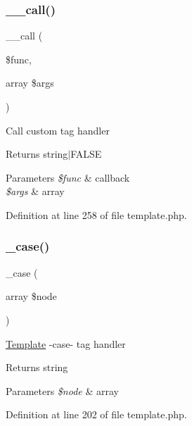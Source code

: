 \subsubsection{\texorpdfstring{\+\_\+\+\_\+call()}{\_\_call()}}
{\footnotesize\ttfamily \+\_\+\+\_\+call (\begin{DoxyParamCaption}\item[{}]{\$func,  }\item[{array}]{\$args }\end{DoxyParamCaption})}

Call custom tag handler \begin{DoxyReturn}{Returns}
string$\vert$\+F\+A\+L\+SE 
\end{DoxyReturn}

\begin{DoxyParams}{Parameters}
{\em \$func} & callback \\
\hline
{\em \$args} & array \\
\hline
\end{DoxyParams}


Definition at line 258 of file template.\+php.

\hypertarget{class_template_ae79c95442d3831174486776ca3090bb6}{}\label{class_template_ae79c95442d3831174486776ca3090bb6} 
\subsubsection{\texorpdfstring{\+\_\+case()}{\_case()}}
{\footnotesize\ttfamily \+\_\+case (\begin{DoxyParamCaption}\item[{array}]{\$node }\end{DoxyParamCaption})\hspace{0.3cm}{\ttfamily [protected]}}

\hyperlink{class_template}{Template} -\/case-\/ tag handler \begin{DoxyReturn}{Returns}
string 
\end{DoxyReturn}

\begin{DoxyParams}{Parameters}
{\em \$node} & array \\
\hline
\end{DoxyParams}


Definition at line 202 of file template.\+php.

\hypertarget{class_template_a3a731dbfb5232fd26198927fcd60c886}{}\label{class_template_a3a731dbfb5232fd26198927fcd60c886} 
